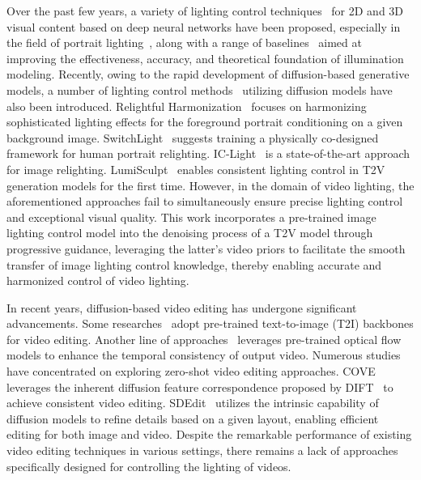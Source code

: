Over the past few years, a variety of lighting control techniques~\citep{sun2019single, nestmeyer2020learning, pandey2021total} for 2D and 3D visual content based on deep neural networks have been proposed, especially in the field of portrait lighting~\citep{shu2017portrait, barron2014shape, sengupta2018sfsnet, shih2014style, kim2024switchlight}, along with a range of baselines~\citep{zhou2019deep, sengupta2021light, hou2021towards, wang2023sunstage, zhou2023relightable} aimed at improving the effectiveness, accuracy, and theoretical foundation of illumination modeling. Recently, owing to the rapid development of diffusion-based generative models, a number of lighting control methods~\citep{ren2024relightful, zeng2024dilightnet, deng2025flashtex, jin2024neural} utilizing diffusion models have also been introduced. Relightful Harmonization~\citep{ren2024relightful} focuses on harmonizing sophisticated lighting effects for the foreground portrait conditioning on a given background image.
SwitchLight~\citep{kim2024switchlight} suggests training a physically co-designed framework for human portrait relighting. IC-Light~\citep{zhang2025scaling} is a state-of-the-art approach for image relighting. LumiSculpt~\citep{zhang2024lumisculpt} enables consistent lighting control in T2V generation models for the first time. However, in the domain of video lighting, the aforementioned approaches fail to simultaneously ensure precise lighting control and exceptional visual quality. This work incorporates a pre-trained image lighting control model into the denoising process of a T2V model through progressive guidance, leveraging the latter's video priors to facilitate the smooth transfer of image lighting control knowledge, thereby enabling accurate and harmonized control of video lighting.

In recent years, diffusion-based video editing has undergone significant advancements. 
Some researches~\citep{liu2024video, wang2023zero, wu2023tune, ma2024follow, mokady2023null} 
adopt pre-trained text-to-image (T2I) backbones for video editing. Another line of approaches~\citep{yang2024fresco, yang2023rerender, cong2023flatten, hu2023videocontrolnet} leverages pre-trained optical flow models to enhance the temporal consistency of output video. Numerous studies~\citep{qi2023fatezero, geyer2023tokenflow, kara2024rave} have concentrated on exploring zero-shot video editing approaches. COVE~\citep{wang2024cove} leverages the inherent diffusion feature correspondence proposed by DIFT~\citep{tang2023emergent} to achieve consistent video editing. SDEdit~\citep{meng2021sdedit} utilizes the intrinsic capability of diffusion models to refine details based on a given layout, enabling efficient editing for both image and video. Despite the remarkable performance of existing video editing techniques in various settings, there remains a lack of approaches specifically designed for controlling the lighting of videos. 